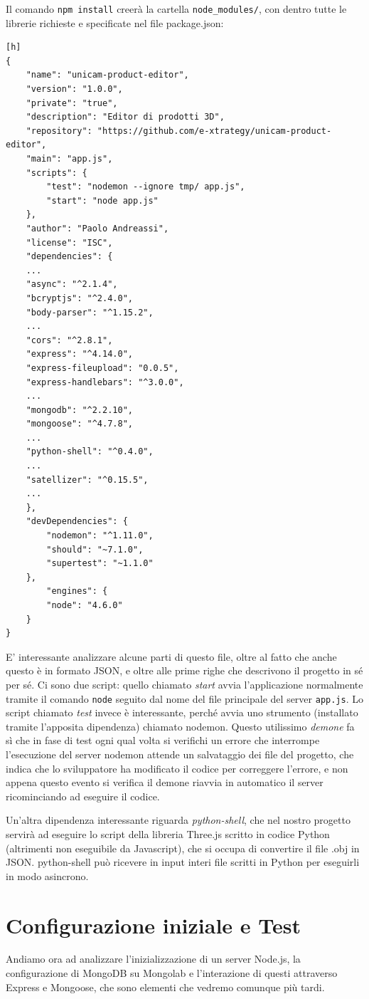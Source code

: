 Il comando \texttt{npm install} creerà la cartella \texttt{node\_modules/}, con dentro tutte le librerie richieste e specificate nel file package.json:

\begin{lstlisting}[caption={package.json}, style=javaScriptCode][h]
{
	"name": "unicam-product-editor",
	"version": "1.0.0",
	"private": "true",
	"description": "Editor di prodotti 3D",
	"repository": "https://github.com/e-xtrategy/unicam-product-editor",
	"main": "app.js",
	"scripts": {
		"test": "nodemon --ignore tmp/ app.js",
		"start": "node app.js"
	},
	"author": "Paolo Andreassi",
	"license": "ISC",
	"dependencies": {
	...
	"async": "^2.1.4",
	"bcryptjs": "^2.4.0",
	"body-parser": "^1.15.2",
	...
	"cors": "^2.8.1",
	"express": "^4.14.0",
	"express-fileupload": "0.0.5",
	"express-handlebars": "^3.0.0",
	...
	"mongodb": "^2.2.10",
	"mongoose": "^4.7.8",
	...
	"python-shell": "^0.4.0",
	...
	"satellizer": "^0.15.5",
	...
	},
	"devDependencies": {
		"nodemon": "^1.11.0",
		"should": "~7.1.0",
		"supertest": "~1.1.0"
	},
		"engines": {
		"node": "4.6.0"
	}
}
\end{lstlisting}

E' interessante analizzare alcune parti di questo file, oltre al fatto che anche questo è in formato JSON, e oltre alle prime righe che descrivono il progetto in sé per sé.
Ci sono due script: quello chiamato \emph{start} avvia l'applicazione normalmente tramite il comando \texttt{node} seguito dal nome del file principale del server \texttt{app.js}.
Lo script chiamato \emph{test} invece è interessante, perché avvia uno strumento (installato tramite l'apposita dipendenza) chiamato nodemon. Questo utilissimo \emph{demone} fa sì che in fase di test ogni qual volta si verifichi un errore che interrompe l'esecuzione del server nodemon attende un salvataggio dei file del progetto, che indica che lo sviluppatore ha modificato il codice per correggere l'errore, e non appena questo evento si verifica il demone riavvia in automatico il server ricominciando ad eseguire il codice.

Un'altra dipendenza interessante riguarda \emph{python-shell}, che nel nostro progetto servirà ad eseguire lo script della libreria Three.js scritto in codice Python (altrimenti non eseguibile da Javascript), che si occupa di convertire il file .obj in JSON. python-shell può ricevere in input interi file scritti in Python per eseguirli in modo asincrono.

\section{Configurazione iniziale e Test}
Andiamo ora ad analizzare l'inizializzazione di un server Node.js, la configurazione di MongoDB su Mongolab e l'interazione di questi attraverso Express e Mongoose, che sono elementi che vedremo comunque più tardi.

